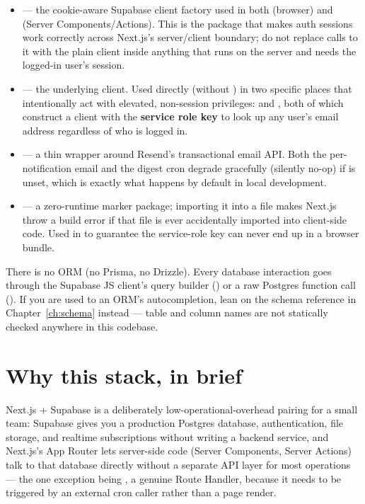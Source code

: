 \begin{itemize}
  \item \textbf{} — the cookie-aware Supabase client factory used in both  (browser) and  (Server Components/Actions). This is the package that makes auth sessions work correctly across Next.js's server/client boundary; do not replace calls to it with the plain  client inside anything that runs on the server and needs the logged-in user's session.
  \item \textbf{} — the underlying client. Used directly (without ) in two specific places that intentionally act with elevated, non-session privileges:  and , both of which construct a client with the \textbf{service role key} to look up any user's email address regardless of who is logged in.
  \item \textbf{} — a thin wrapper around Resend's transactional email API. Both the per-notification email and the digest cron degrade gracefully (silently no-op) if  is unset, which is exactly what happens by default in local development.
  \item \textbf{} — a zero-runtime marker package; importing it into a file makes Next.js throw a build error if that file is ever accidentally imported into client-side code. Used in  to guarantee the service-role key can never end up in a browser bundle.
\end{itemize}

\begin{olktip}
There is no ORM (no Prisma, no Drizzle). Every database interaction goes through the Supabase JS client's query builder () or a raw Postgres function call (). If you are used to an ORM's autocompletion, lean on the schema reference in Chapter~\ref{ch:schema} instead — table and column names are not statically checked anywhere in this codebase.
\end{olktip}

\section{Why this stack, in brief}

Next.js + Supabase is a deliberately low-operational-overhead pairing for a small team: Supabase gives you a production Postgres database, authentication, file storage, and realtime subscriptions without writing a backend service, and Next.js's App Router lets server-side code (Server Components, Server Actions) talk to that database directly without a separate API layer for most operations — the one exception being , a genuine Route Handler, because it needs to be triggered by an external cron caller rather than a page render.

